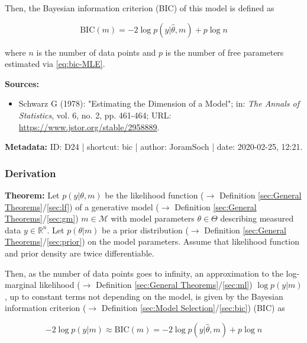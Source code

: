 \documentclass[a4paper,12pt,twoside]{book}
\begin{document}
Then, the Bayesian information criterion (BIC) of this model is defined as

\begin{equation} \label{eq:bic-BIC}
\mathrm{BIC}(m) = -2 \log p(y | \hat{\theta}, m) + p \log n
\end{equation}

where $n$ is the number of data points and $p$ is the number of free parameters estimated via \eqref{eq:bic-MLE}.


\vspace{1em}
\textbf{Sources:}
\begin{itemize}
\item Schwarz G (1978): "Estimating the Dimension of a Model"; in: \textit{The Annals of Statistics}, vol. 6, no. 2, pp. 461-464; URL: \url{https://www.jstor.org/stable/2958889}.
\end{itemize}


\vspace{1em}
\textbf{Metadata:} ID: D24 | shortcut: bic | author: JoramSoch | date: 2020-02-25, 12:21.
\vspace{1em}



\subsubsection[\textbf{Derivation}]{Derivation} \label{sec:bic-der}
\setcounter{equation}{0}

\textbf{Theorem:} Let $p(y \vert \theta, m)$ be the likelihood function ($\rightarrow$ Definition \ref{sec:General Theorems}/\ref{sec:lf}) of a generative model ($\rightarrow$ Definition \ref{sec:General Theorems}/\ref{sec:gm}) $m \in \mathcal{M}$ with model parameters $\theta \in \Theta$ describing measured data $y \in \mathbb{R}^n$. Let $p(\theta \vert m)$ be a prior distribution ($\rightarrow$ Definition \ref{sec:General Theorems}/\ref{sec:prior}) on the model parameters. Assume that likelihood function and prior density are twice differentiable.

Then, as the number of data points goes to infinity, an approximation to the log-marginal likelihood ($\rightarrow$ Definition \ref{sec:General Theorems}/\ref{sec:ml}) $\log p(y \vert m)$, up to constant terms not depending on the model, is given by the Bayesian information criterion ($\rightarrow$ Definition \ref{sec:Model Selection}/\ref{sec:bic}) (BIC) as

\begin{equation} \label{eq:bic-der-BIC}
-2 \log p(y|m) \approx \mathrm{BIC}(m) = -2 \log p(y|\hat{\theta}, m) + p \log n
\end{equation}
\end{document}
